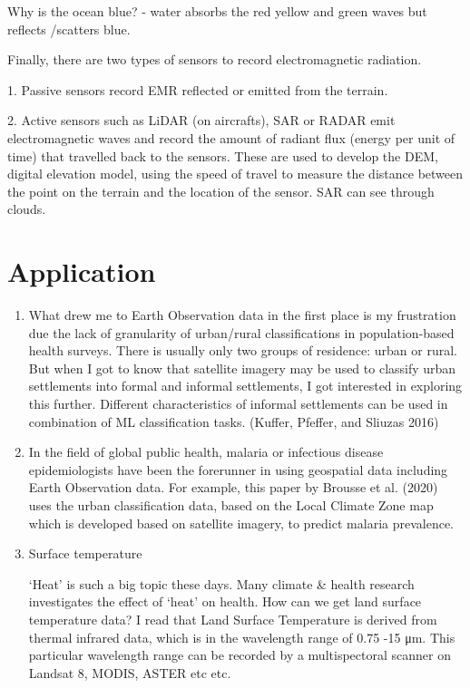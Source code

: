 \documentclass[
  letterpaper,
  DIV=11,
  numbers=noendperiod]{scrreprt}
\begin{document}
Why is the ocean blue? - water absorbs the red yellow and green waves
but reflects /scatters blue.

Finally, there are two types of sensors to record electromagnetic
radiation.

1. Passive sensors record EMR reflected or emitted from the terrain.

2. Active sensors such as LiDAR (on aircrafts), SAR or RADAR emit
electromagnetic waves and record the amount of radiant flux (energy per
unit of time) that travelled back to the sensors. These are used to
develop the DEM, digital elevation model, using the speed of travel to
measure the distance between the point on the terrain and the location
of the sensor. SAR can see through clouds.

\hypertarget{application}{%
\section{Application}\label{application}}

\begin{enumerate}
\def\labelenumi{\arabic{enumi}.}
\item
  What drew me to Earth Observation data in the first place is my
  frustration due the lack of granularity of urban/rural classifications
  in population-based health surveys. There is usually only two groups
  of residence: urban or rural. But when I got to know that satellite
  imagery may be used to classify urban settlements into formal and
  informal settlements, I got interested in exploring this further.
  Different characteristics of informal settlements can be used in
  combination of ML classification tasks. (Kuffer, Pfeffer, and Sliuzas
  2016)
\item
  In the field of global public health, malaria or infectious disease
  epidemiologists have been the forerunner in using geospatial data
  including Earth Observation data. For example, this paper by Brousse
  et al. (2020) uses the urban classification data, based on the Local
  Climate Zone map which is developed based on satellite imagery, to
  predict malaria prevalence.
\item
  Surface temperature

  `Heat' is such a big topic these days. Many climate \& health research
  investigates the effect of `heat' on health. How can we get land
  surface temperature data? I read that Land Surface Temperature is
  derived from thermal infrared data, which is in the wavelength range
  of 0.75 -15 μm. This particular wavelength range can be recorded by a
  multispectoral scanner on Landsat 8, MODIS, ASTER etc etc.
\end{enumerate}
\end{document}
